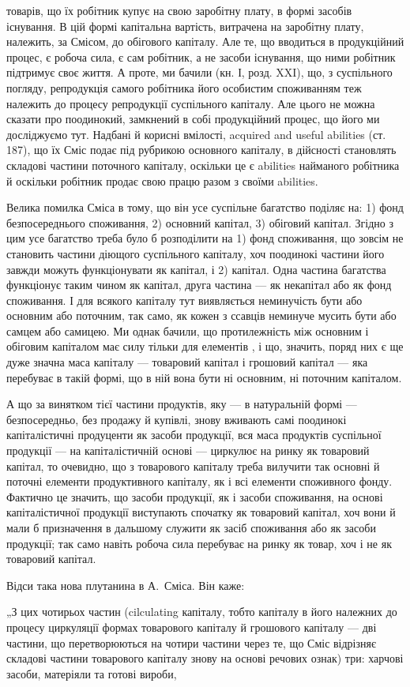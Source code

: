 \parcont{}  %
товарів, що їх робітник купує на свою заробітну плату, в формі засобів
існування. В цій формі капітальна вартість, витрачена на заробітну плату,
належить, за Смісом, до обігового капіталу. Але те, що вводиться в
продукційний процес, є робоча сила, є сам робітник, а не засоби існування,
що ними робітник підтримує своє життя. А проте, ми бачили
(кн. І, розд. XXI), що, з суспільного погляду, репродукція самого робітника
його особистим споживанням теж належить до процесу репродукції
суспільного капіталу. Але цього не можна сказати про поодинокий,
замкнений в собі продукційний процес, що його ми досліджуємо тут.
Надбані й корисні вмілості, acquired and useful abilities (ст. 187), що їх
Сміс подає під рубрикою основного капіталу, в дійсності становлять
складові частини поточного капіталу, оскільки це є abilities найманого
робітника й оскільки робітник продає свою працю разом з своїми abilities.

Велика помилка Сміса в тому, що він усе суспільне багатство поділяє
на: 1) фонд безпосереднього споживання, 2) основний капітал,
3) обіговий капітал. Згідно з цим усе багатство треба було б розподілити
на 1) фонд споживання, що зовсім не становить частини діющого
суспільного капіталу, хоч поодинокі частини його завжди можуть функціонувати
як капітал, і 2) капітал. Одна частина багатства функціонує
таким чином як капітал, друга частина — як некапітал або як фонд
споживання. І для всякого капіталу тут виявляється неминучість бути
або основним або поточним, так само, як кожен з ссавців неминуче мусить
бути або самцем або самицею. Ми однак бачили, що протилежність
між основним і обіговим капіталом має силу тільки для елементів , і що, значить, поряд них є ще дуже значна
маса капіталу — товаровий капітал і грошовий капітал — яка перебуває в
такій формі, що в ній  вона бути ні основним, ні поточним
капіталом.

А що за винятком тієї частини продуктів, яку — в натуральній формі —
безпосередньо, без продажу й купівлі, знову вживають самі поодинокі
капіталістичні продуценти як засоби продукції, вся маса продуктів суспільної
продукції — на капіталістичній основі — циркулює на ринку як
товаровий капітал, то очевидно, що з товарового капіталу треба вилучити
так основні й поточні елементи продуктивного капіталу, як і всі
елементи споживного фонду. Фактично це значить, що засоби продукції,
як і засоби споживання, на основі капіталістичної продукції виступають
спочатку як товаровий капітал, хоч вони й мали б призначення в
дальшому служити як засіб споживання або як засоби продукції; так само
навіть робоча сила перебуває на ринку як товар, хоч і не як товаровий
капітал.

Відси така нова плутанина в А.~Сміса. Він каже:

„З цих чотирьох частин (cilculating капіталу, тобто капіталу в його
належних до процесу циркуляції формах товарового капіталу й грошового
капіталу — дві частини, що перетворюються на чотири частини через
те, що Сміс відрізняє складові частини товарового капіталу знову на
основі речових ознак) три: харчові засоби, матеріяли та готові вироби,
\parbreak{}  %
